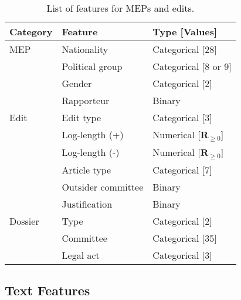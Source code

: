 \begin{table}
  \centering
	\caption{List of features for MEPs and edits.}
	\label{lmp:tab:features}
	\begin{tabular}{lll}
		\toprule
		Category & Feature            & Type [Values]                     \\
		\midrule
		MEP      & Nationality        & Categorical [28]                  \\
		         & Political group    & Categorical [8 or 9]              \\
		         & Gender             & Categorical [2]                   \\
		         & Rapporteur         & Binary                            \\
		Edit     & Edit type          & Categorical [3]                   \\
		         & Log-length (+)     & Numerical [$\mathbf{R}_{\geq 0}$] \\
		         & Log-length (-)     & Numerical [$\mathbf{R}_{\geq 0}$] \\
		         & Article type       & Categorical [7]                   \\
		         & Outsider committee & Binary                            \\
		         & Justification      & Binary                            \\
		Dossier  & Type               & Categorical [2]                   \\
		         & Committee          & Categorical [35]                  \\
		         & Legal act          & Categorical [3]                   \\
		\bottomrule
	\end{tabular}
\end{table}

\subsection{Text Features}


